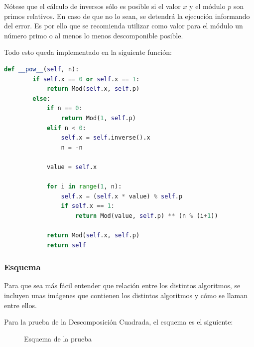 Nótese que el cálculo de inversos sólo es posible si el valor $x$ y el módulo $p$ son primos relativos. En caso de que no lo sean, se detendrá la ejecución informando del error. Es por ello que se recomienda utilizar como valor para el módulo un número primo o al menos lo menos descomponible posible.

Todo esto queda implementado en la siguiente función:
\begin{lstlisting}[language=Python, basicstyle=\footnotesize]
   def __pow__(self, n):
        if self.x == 0 or self.x == 1:
            return Mod(self.x, self.p)
        else:
            if n == 0:
                return Mod(1, self.p)
            elif n < 0:
                self.x = self.inverse().x
                n = -n

            value = self.x

            for i in range(1, n):
                self.x = (self.x * value) % self.p
                if self.x == 1:
                    return Mod(value, self.p) ** (n % (i+1))

            return Mod(self.x, self.p)
            return self
\end{lstlisting}

\subsubsection{Esquema}

Para que sea más fácil entender que relación entre los distintos algoritmos, se incluyen unas imágenes que contienen los distintos algoritmos y cómo se llaman entre ellos.

Para la prueba de la Descomposición Cuadrada, el esquema es el siguiente: \\
\begin{figure}[H]
    \centering
    \caption{Esquema de la prueba}
\end{figure}

